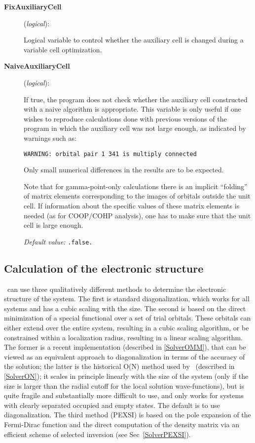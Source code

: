 \begin{description}

\item[\textbf{FixAuxiliaryCell}] (\textit{logical}):

Logical variable to control whether the auxiliary cell is changed
during a variable cell optimization.

\item[\textbf{NaiveAuxiliaryCell}] (\textit{logical}):

If true, the program does not check whether the auxiliary cell
constructed with a naive algorithm is appropriate. This variable is
only useful if one wishes to reproduce calculations done with previous
versions of the program in which the auxiliary cell was not large
enough, as indicated by warnings such as:

\texttt{WARNING: orbital pair 1 341 is multiply connected}

Only small numerical differences in the results are to be expected.

Note that for gamma-point-only calculations there is an implicit
``folding'' of matrix elements corresponding to the images of orbitals
outside the unit cell. If information about the specific values of
these matrix elements is needed (as for COOP/COHP analysis), one has
to make sure that the unit cell is large enough.  

\textit{Default value:} \texttt{.false.}

\end{description}


\subsection{Calculation of the electronic structure}

\siesta\ can use three qualitatively different methods to determine
the electronic structure of the system. The first is standard
diagonalization, which works for all systems and has a cubic scaling
with the size. The second is based on
the direct minimization of a special functional over a set of
trial orbitals. These orbitals can either extend over the entire system,
resulting in a cubic scaling algorithm, or be constrained within a
localization radius, resulting in a linear scaling algorithm. The former
is a recent implementation (described in \ref{SolverOMM}), that can
be viewed as an equivalent approach to diagonalization in terms of the
accuracy of the solution; the latter is the historical O(N) method used by
\siesta\ (described in \ref{SolverON}); it scales in principle
linearly with the size of the system (only if the size is larger than
the radial cutoff for the local solution wave-functions), but is quite
fragile and substantially more difficult to use, and only works for
systems with clearly separated occupied and empty states. The default is
to use diagonalization. The third method (PEXSI) is based on the
pole expansion of the Fermi-Dirac function and the direct computation
of the density matrix via an efficient scheme of selected
inversion (see Sec~\ref{SolverPEXSI}).

